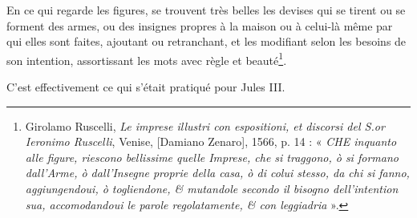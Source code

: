 \documentclass[12pt,twoside,openany]{book}
\renewenvironment{quote}
  {%
    \par\begingroup
    \fontsize{11pt}{14pt}\selectfont
    \list{}{\leftmargin=1.5em\rightmargin=1.5em}%
    \item\relax
  }
  {%
    \endlist
    \endgroup
  }
\newenvironment{PurhBlockQuote}
  {%
    \begin{quote}
  }
  {%
    \end{quote}
  }
\begin{document}
\begin{PurhBlockQuote}
En ce qui regarde les figures, se trouvent très belles les devises qui se tirent ou se forment des armes, ou des insignes propres à la maison ou à celui-là même par qui elles sont faites, ajoutant ou retranchant, et les modifiant selon les besoins de son intention, assortissant les mots avec règle et beauté\footnote{Girolamo Ruscelli,\textit{ Le imprese illustri con espositioni, et discorsi del S.or Ieronimo Ruscelli}, Venise, [Damiano Zenaro], 1566, p. 14 : « \textit{CHE inquanto alle figure, riescono bellissime quelle Imprese, che si traggono, ò si formano dall’Arme, ò dall’Insegne proprie della casa, ò di colui stesso, da chi si fanno, aggiungendoui, ò togliendone, \& mutandole secondo il bisogno dell’intention sua, accomodandoui le parole regolatamente, \& con leggiadria} ».}.
\end{PurhBlockQuote}

C’est effectivement ce qui s’était pratiqué pour Jules III.
\end{document}
